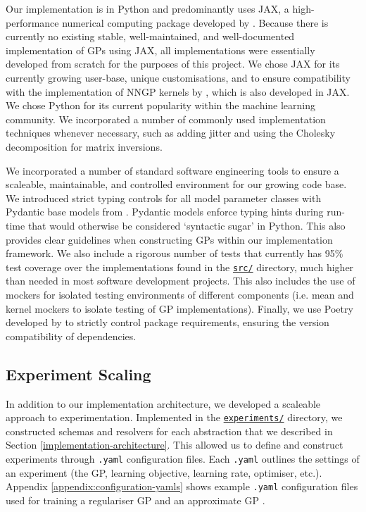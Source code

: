 \documentclass{article}
\def\code#1{\texttt{#1}}
\numberwithin{equation}{section}
\begin{document}
Our implementation is in Python and predominantly uses JAX, a high-performance numerical computing package developed by \cite{jax2018github}.
Because there is currently no existing stable, well-maintained, and well-documented implementation of GPs using JAX, all implementations were essentially developed from scratch for the purposes of this project.
We chose JAX for its currently growing user-base, unique customisations, and to ensure compatibility with the implementation of NNGP kernels by \cite{novak2019neural}, which is also developed in JAX.
We chose Python for its current popularity within the machine learning community.
We incorporated a number of commonly used implementation techniques whenever necessary, such as adding jitter and using the Cholesky decomposition for matrix inversions.

We incorporated a number of standard software engineering tools to ensure a scaleable, maintainable, and controlled environment for our growing code base.
We introduced strict typing controls for all model parameter classes with Pydantic base models from \cite{samuel_colvin_2023_8277473}.
Pydantic models enforce typing hints during run-time that would otherwise be considered `syntactic sugar' in Python. This also provides clear guidelines when constructing GPs within our implementation framework.
We also include a rigorous number of tests that currently has 95\% test coverage over the implementations found in the \href{https://github.com/jswu18/generalised-variational-inference-for-gaussian-processes/tree/main/src}{\code{src/}} directory, much higher than needed in most software development projects.
This also includes the use of mockers for isolated testing environments of different components (i.e. mean and kernel mockers to isolate testing of GP implementations). 
Finally, we use Poetry developed by \cite{Eustace} to strictly control package requirements, ensuring the version compatibility of dependencies.

\subsection{Experiment Scaling}
In addition to our implementation architecture, we developed a scaleable approach to experimentation.
Implemented in the \href{https://github.com/jswu18/generalised-variational-inference-for-gaussian-processes/tree/main/experiments}{\code{experiments/}} directory, we constructed schemas and resolvers for each abstraction that we described in Section \ref{implementation-architecture}.
This allowed us to define and construct experiments through \code{.yaml} configuration files.
Each \code{.yaml} outlines the settings of an experiment (the GP, learning objective, learning rate, optimiser, etc.).
Appendix \ref{appendix:configuration-yamls} shows example \code{.yaml} configuration files used for training a regulariser GP and an approximate GP .
\end{document}
